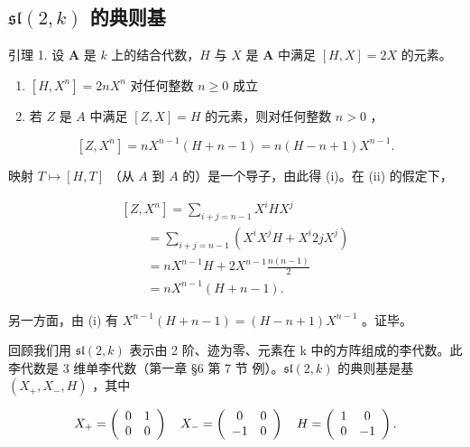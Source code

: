 \subsection{\texorpdfstring{\(\mathfrak{sl}(2,k)\) 的典则基}{\textbackslash mathfrak\{sl\}(2,k) 的典则基}}

引理 1. 设 \(\mathbf{A}\) 是 \(k\) 上的结合代数，\(H\) 与 \(X\) 是 \(\mathbf{A}\) 中满足 \([H, X] = 2X\) 的元素。

\begin{enumerate}
\def\labelenumi{(\roman{enumi})}
\item
  \([H,X^n ] = 2nX^n\) 对任何整数 \(n\geq 0\) 成立
\item
  若 \(Z\) 是 \(A\) 中满足 \([Z, X] = H\) 的元素，则对任何整数 \(n > 0\) ，
\end{enumerate}

\[
[ Z, X ^ {n} ] = n X ^ {n - 1} (H + n - 1) = n (H - n + 1) X ^ {n - 1}.
\]

映射 \(T \mapsto [H, T]\) （从 \(A\) 到 \(A\) 的）是一个导子，由此得 (i)。在 (ii) 的假定下，

\[
\begin{array}{l} [ Z, X ^ {n} ] = \sum_ {i + j = n - 1} X ^ {i} H X ^ {j} \\ \qquad = \sum_ {i + j = n - 1} (X ^ {i} X ^ {j} H + X ^ {i} 2 j X ^ {j}) \\ \qquad = n X ^ {n - 1} H + 2 X ^ {n - 1} \frac {n (n - 1)}{2} \\ \qquad = n X ^ {n - 1} (H + n - 1). \end{array}
\]

另一方面，由 (i) 有 \(X^{n-1}(H+n-1)=(H-n+1)X^{n-1}\) 。证毕。

回顾我们用 \(\mathfrak{sl}(2,k)\) 表示由 2 阶、迹为零、元素在 k 中的方阵组成的李代数。此李代数是 3 维单李代数（第一章 §6 第 7 节 例）。\(\mathfrak{sl}(2,k)\) 的典则基是基 \((X_{+},X_{-},H)\) ，其中

\[
X _ {+} = \left( \begin{array}{c c} 0 & 1 \\ 0 & 0 \end{array} \right) \quad X _ {-} = \left( \begin{array}{c c} 0 & 0 \\ - 1 & 0 \end{array} \right) \quad H = \left( \begin{array}{c c} 1 & 0 \\ 0 & - 1 \end{array} \right).
\]

